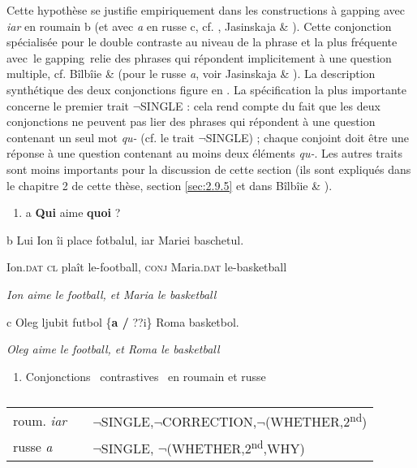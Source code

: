 Cette hypothèse se justifie empiriquement dans les constructions à gapping avec \textit{iar} en roumain b (et avec \textit{a} en russe c, cf. \citet{Kazenin2001}, Jasinskaja \& \citet{Zeevat2009}). Cette conjonction spécialisée pour le double contraste au niveau de la phrase et la plus fréquente avec~le gapping~relie des phrases qui répondent implicitement à une question multiple, cf. Bîlbîie \& \citet{Winterstein2011} (pour le russe \textit{a}, voir Jasinskaja \& \citet{Zeevat2010}). La description synthétique des deux conjonctions figure en . La spécification la plus importante concerne le premier trait ${\lnot}$SINGLE : cela rend compte du fait que les deux conjonctions ne peuvent pas lier des phrases qui répondent à une question contenant un seul mot \textit{qu-} (cf. le trait ${\lnot}$SINGLE) ; chaque conjoint doit être une réponse à une question contenant au moins deux éléments \textit{qu-}. Les autres traits sont moins importants pour la discussion de cette section (ils sont expliqués dans le chapitre 2 de cette thèse, section \ref{sec:2.9.5} et dans Bîlbîie \& \citet{Winterstein2011}). 


\begin{enumerate}
\item \label{bkm:Ref289640885}a  \textbf{Qui} aime \textbf{quoi} ? 


\end{enumerate}
  b  Lui Ion îi place fotbalul, iar Mariei baschetul. 

    Ion\textsc{.dat cl} plaît le-football, \textsc{conj} Maria\textsc{.dat} le-basketball

{\itshape
Ion aime le football, et Maria le basketball}

  c  Oleg ljubit futbol \{\textbf{a /} ??i\} Roma basketbol. 

{\itshape
Oleg aime le football, et Roma le basketball } 


\begin{enumerate}
\item \label{bkm:Ref289640714}Conjonctions {\guillemotleft}~contrastives~{\guillemotright} en roumain et russe


\end{enumerate}

\begin{table}


\begin{tabular}{lll}

roum. \textit{iar} &  & ${\lnot}$SINGLE,${\lnot}$CORRECTION,${\lnot}$(WHETHER,2\textsuperscript{nd})\\
  russe \textit{a}\par &  & ${\lnot}$SINGLE, ${\lnot}$(WHETHER,2\textsuperscript{nd},WHY)\\
\end{tabular}

\caption{}
\end{table}

